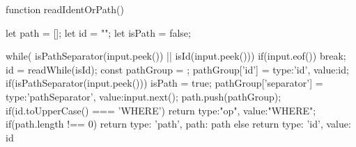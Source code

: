 function readIdentOrPath() {                                                                

  let path = [];
  let id = "";
  let isPath = false;
  
  while( isPathSeparator(input.peek()) || isId(input.peek())){       
    if(input.eof()) break;
    id = readWhile(isId);                                                                            
    const pathGroup = {};
    pathGroup['id'] = {type:'id', value:id};                                                         
    if(isPathSeparator(input.peek())) {                                                         isPath = true;                                                                            pathGroup['separator'] = {type:'pathSeparator', value:input.next()};                      path.push(pathGroup);                                                                   }
  }       
  if(id.toUpperCase() === 'WHERE') {                                                            return {type:"op", value:"WHERE"};                                                      
  }                                                                                                  
  if(path.length !== 0) {
    return { type: 'path', path: path }       
  } else {
    return { type: 'id', value: id } 
  }                                                                                                  
}